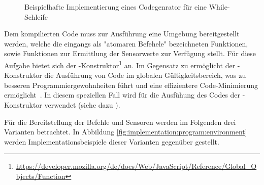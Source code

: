 \begin{figure}
  
  \caption{Beispielhafte Implementierung eines Codegenrator für eine While-Schleife}
  \label{fig:implementation:program:evaluation:while}
\end{figure}


Dem kompilierten Code muss zur Ausführung eine Umgebung bereitgestellt werden, welche die eingangs als "atomaren Befehele" bezeichneten Funktionen, sowie Funktionen zur Ermittlung der Sensorwerte zur Verfügung stellt. Für diese Aufgabe bietet sich der -Konstruktor\footnote{\url{https://developer.mozilla.org/de/docs/Web/JavaScript/Reference/Global_Objects/Function}} an. Im Gegensatz zu  ermöglicht der -Konstruktor die Ausführung von Code im globalen Gültigkeitsbereich, was zu besseren Programmiergewohnheiten führt und eine effizientere Code-Minimierung ermöglicht~\cite{mdn-function}. In diesem speziellen Fall wird für die Ausfühung des Codes der -Konstruktor verwendet (siehe dazu ).

Für die Bereitstellung der Befehle und Sensoren werden im Folgenden drei Varianten betrachtet. In Abbildung \ref{fig:implementation:program:environment} werden Implementationsbeispiele dieser Varianten gegenüber gestellt.

